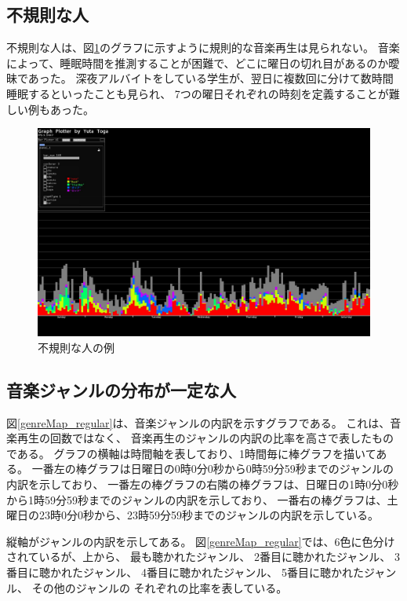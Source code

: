 \documentclass[11pt, onecolumn]{jsarticle}
\begin{document}
\subsection{不規則な人}
不規則な人は、図\ref{sample_irregular}のグラフに示すように規則的な音楽再生は見られない。
音楽によって、睡眠時間を推測することが困難で、どこに曜日の切れ目があるのか曖昧であった。
深夜アルバイトをしている学生が、翌日に複数回に分けて数時間睡眠するといったことも見られ、
7つの曜日それぞれの時刻を定義することが難しい例もあった。

\begin{figure}[h]
\begin{center}
\includegraphics[width=14cm]{sample_irregular.jpg}
\caption{不規則な人の例}
\label{sample_irregular}
\end{center}
\end{figure}

\subsection{音楽ジャンルの分布が一定な人}
図\ref{genreMap_regular}は、音楽ジャンルの内訳を示すグラフである。
これは、音楽再生の回数ではなく、
音楽再生のジャンルの内訳の比率を高さで表したものである。
グラフの横軸は時間軸を表しており、1時間毎に棒グラフを描いてある。
一番左の棒グラフは日曜日の0時0分0秒から0時59分59秒までのジャンルの内訳を示しており、
一番左の棒グラフの右隣の棒グラフは、日曜日の1時0分0秒から1時59分59秒までのジャンルの内訳を示しており、
一番右の棒グラフは、土曜日の23時0分0秒から、23時59分59秒までのジャンルの内訳を示している。

縦軸がジャンルの内訳を示してある。
図\ref{genreMap_regular}では、6色に色分けされているが、上から、
最も聴かれたジャンル、
2番目に聴かれたジャンル、
3番目に聴かれたジャンル、
4番目に聴かれたジャンル、
5番目に聴かれたジャンル、
その他のジャンルの
それぞれの比率を表している。
\end{document}
